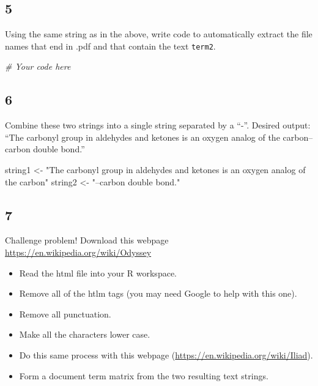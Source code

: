 \documentclass[
]{book}
\newenvironment{Shaded}{\begin{snugshade}}{\end{snugshade}}
\newcommand{\CommentTok}[1]{\textcolor[rgb]{0.56,0.35,0.01}{\textit{#1}}}
\newcommand{\NormalTok}[1]{#1}
\newcommand{\StringTok}[1]{\textcolor[rgb]{0.31,0.60,0.02}{#1}}
\providecommand{\tightlist}{%
  \setlength{\itemsep}{0pt}\setlength{\parskip}{0pt}}
\theoremstyle{definition}
\theoremstyle{definition}
\theoremstyle{definition}
\theoremstyle{remark}
\begin{document}
\hypertarget{section-21}{%
\subsection*{5}\label{section-21}}

Using the same string as in the above, write code to automatically extract the file names that end in .pdf and that contain the text \texttt{term2}.

\begin{Shaded}
\begin{Highlighting}[]
\CommentTok{\# Your code here}
\end{Highlighting}
\end{Shaded}

\hypertarget{section-22}{%
\subsection*{6}\label{section-22}}

Combine these two strings into a single string separated by a ``-''. Desired output: ``The carbonyl group in aldehydes and ketones is an oxygen analog of the carbon--carbon double bond.''

\begin{Shaded}
\begin{Highlighting}[]
\NormalTok{string1 <{-}}\StringTok{ "The carbonyl group in aldehydes and ketones }
\StringTok{            is an oxygen analog of the carbon"} 
\NormalTok{string2 <{-}}\StringTok{  "–carbon double bond."}
\end{Highlighting}
\end{Shaded}

\hypertarget{section-23}{%
\subsection*{7}\label{section-23}}

Challenge problem! Download this webpage \url{https://en.wikipedia.org/wiki/Odyssey}

\begin{itemize}
\tightlist
\item
  Read the html file into your R workspace.
\item
  Remove all of the htlm tags (you may need Google to help with this one).
\item
  Remove all punctuation.
\item
  Make all the characters lower case.
\item
  Do this same process with this webpage (\url{https://en.wikipedia.org/wiki/Iliad}).
\item
  Form a document term matrix from the two resulting text strings.
\end{itemize}
\end{document}
